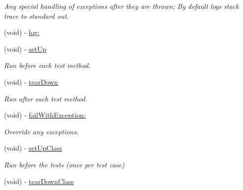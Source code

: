 \begin{DoxyCompactItemize}
\begin{DoxyCompactList}\small\item\em \-Any special handling of exceptions after they are thrown; \-By default logs stack trace to standard out. \end{DoxyCompactList}\item 
(void) -\/ \hyperlink{interface_g_h_test_case_a432eee57d9d2fd6cf5fc47c5aac123bc}{log\-:}
\item 
\hypertarget{interface_g_h_test_case_a7982fb6211eca346bd2477ae15d2b6d8}{
(void) -\/ \hyperlink{interface_g_h_test_case_a7982fb6211eca346bd2477ae15d2b6d8}{set\-Up}}
\label{interface_g_h_test_case_a7982fb6211eca346bd2477ae15d2b6d8}

\begin{DoxyCompactList}\small\item\em \-Run before each test method. \end{DoxyCompactList}\item 
\hypertarget{interface_g_h_test_case_ad800bebf23948e860bc4e3699708dd30}{
(void) -\/ \hyperlink{interface_g_h_test_case_ad800bebf23948e860bc4e3699708dd30}{tear\-Down}}
\label{interface_g_h_test_case_ad800bebf23948e860bc4e3699708dd30}

\begin{DoxyCompactList}\small\item\em \-Run after each test method. \end{DoxyCompactList}\item 
(void) -\/ \hyperlink{interface_g_h_test_case_aebee380283366e513402d9534e74d044}{fail\-With\-Exception\-:}
\begin{DoxyCompactList}\small\item\em \-Override any exceptions. \end{DoxyCompactList}\item 
\hypertarget{interface_g_h_test_case_ab441989e24b9942b73ed790281c1d967}{
(void) -\/ \hyperlink{interface_g_h_test_case_ab441989e24b9942b73ed790281c1d967}{set\-Up\-Class}}
\label{interface_g_h_test_case_ab441989e24b9942b73ed790281c1d967}

\begin{DoxyCompactList}\small\item\em \-Run before the tests (once per test case) \end{DoxyCompactList}\item 
\hypertarget{interface_g_h_test_case_aa34a28629d36d3ce176b12f4a106dbbd}{
(void) -\/ \hyperlink{interface_g_h_test_case_aa34a28629d36d3ce176b12f4a106dbbd}{tear\-Down\-Class}}
\label{interface_g_h_test_case_aa34a28629d36d3ce176b12f4a106dbbd}


\end{DoxyCompactItemize}

